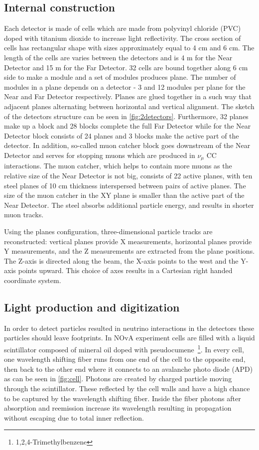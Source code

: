 \subsection{Internal construction}
Each detector is made of cells which are made from polyvinyl chloride (PVC) doped with titanium 
dioxide to increase light reflectivity. The cross section of cells has rectangular shape with sizes
approximately equal to 4 cm and 6 cm. The length of the cells are varies between the detectors and 
is 4 m for the Near Detector and 15 m for the Far Detector. 32 cells are bound together along
6 cm side to make a module and a set of modules produces plane. The number of modules in a plane
depends on a detector - 3 and 12 modules per plane for the Near and Far Detector respectively. Planes
are glued together in a such way that adjacent planes alternating between horizontal and vertical
alignment. The sketch of the detectors structure can be seen in \ref{fig:2detectors}. Furthermore, 32 planes 
make up a block and 28 blocks complete the full Far Detector while for the Near Detector block consists
of 24 planes and 3 blocks make the active part of the detector. In addition, so-called muon catcher
block goes downstream of the Near Detector and serves for stopping muons which are produced in $\nu_\mu$ 
CC interactions. The muon catcher, which helps to contain more muons as the relative size of the Near 
Detector is not big, consists of 22 active planes, with ten steel planes of 10 cm thickness interspersed 
between pairs of active planes. The size of the muon catcher in the XY plane is smaller than the active 
part of the Near Detector. The steel absorbs additional particle energy, and results in shorter muon tracks.

Using the planes configuration, three-dimensional particle tracks are reconstructed: vertical planes
provide X measurements, horizontal planes provide Y measurements, and the Z measurements are extracted from
the plane positions. The Z-axis is directed along the beam, the X-axis points to the west and the Y-axis points
upward. This choice of axes results in a Cartesian right handed coordinate system.

\subsection{Light production and digitization}
In order to detect particles resulted in neutrino interactions in the detectors these particles 
should leave footprints. In NOvA experiment cells are filled with a liquid scintillator composed 
of mineral oil doped with pseudocumene~\footnote{1,2,4-Trimethylbenzene}. In every cell, one wavelength 
shifting fiber runs from one end of the cell to the opposite end, then back to the other end where 
it connects to an avalanche photo diode (APD) as can be seen in \ref{fig:cell}. Photons are created by charged 
particle moving through the scintillator. These reflected by the cell walls and have a high chance 
to be captured by the wavelength shifting fiber. Inside the fiber photons after absorption and
reemission increase its wavelength resulting in propagation without escaping due to total inner
reflection. 


